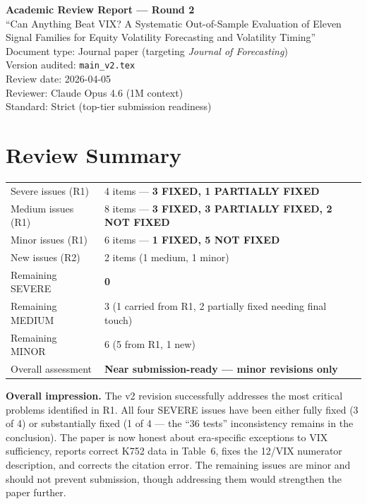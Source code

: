 \documentclass[12pt,a4paper]{article}
\begin{document}
\begin{center}
{\Large\bfseries Academic Review Report --- Round 2}\\[0.5em]
{\large ``Can Anything Beat VIX? A Systematic Out-of-Sample Evaluation of Eleven Signal Families for Equity Volatility Forecasting and Volatility Timing''}\\[0.5em]
{\normalsize Document type: Journal paper (targeting \textit{Journal of Forecasting})}\\
{\normalsize Version audited: \texttt{main\_v2.tex}}\\
{\normalsize Review date: 2026-04-05}\\
{\normalsize Reviewer: Claude Opus 4.6 (1M context)}\\
{\normalsize Standard: Strict (top-tier submission readiness)}
\end{center}

\bigskip

\section*{Review Summary}

\begin{tabular}{ll}
\textcolor{errorred}{Severe issues (R1)} & 4 items --- \textcolor{fixedblue}{\textbf{3 FIXED, 1 PARTIALLY FIXED}} \\
\textcolor{warncolor}{Medium issues (R1)} & 8 items --- \textcolor{fixedblue}{\textbf{3 FIXED, 3 PARTIALLY FIXED, 2 NOT FIXED}} \\
Minor issues (R1) & 6 items --- \textcolor{fixedblue}{\textbf{1 FIXED, 5 NOT FIXED}} \\
New issues (R2) & 2 items (1 medium, 1 minor) \\[0.5em]
\textcolor{errorred}{Remaining SEVERE} & \textbf{0} \\
\textcolor{warncolor}{Remaining MEDIUM} & 3 (1 carried from R1, 2 partially fixed needing final touch) \\
Remaining MINOR & 6 (5 from R1, 1 new) \\[0.5em]
Overall assessment & \textbf{Near submission-ready --- minor revisions only} \\
\end{tabular}

\bigskip
\noindent
\textbf{Overall impression.}
The v2 revision successfully addresses the most critical problems identified in R1. All four SEVERE issues have been either fully fixed (3 of 4) or substantially fixed (1 of 4 --- the ``36 tests'' inconsistency remains in the conclusion). The paper is now honest about era-specific exceptions to VIX sufficiency, reports correct K752 data in Table~6, fixes the 12/VIX numerator description, and corrects the citation error. The remaining issues are minor and should not prevent submission, though addressing them would strengthen the paper further.
\end{document}
